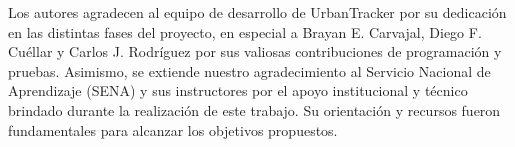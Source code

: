 Los autores agradecen al equipo de desarrollo de UrbanTracker por su dedicación en las distintas fases del proyecto, en especial a Brayan E. Carvajal, Diego F. Cuéllar y Carlos J. Rodríguez por sus valiosas contribuciones de programación y pruebas. Asimismo, se extiende nuestro agradecimiento al Servicio Nacional de Aprendizaje (SENA) y sus instructores por el apoyo institucional y técnico brindado durante la realización de este trabajo. Su orientación y recursos fueron fundamentales para alcanzar los objetivos propuestos.
